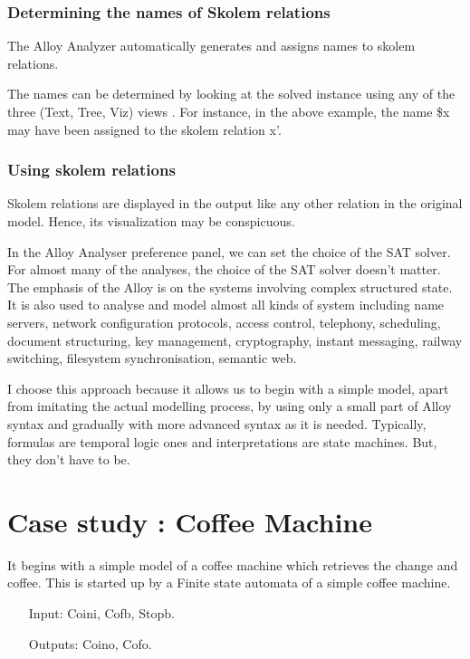 \documentclass[a4paper,12pt]{report}
\begin{document}
\begin{onehalfspacing}
\subsection{Determining the names of Skolem relations }
\label{determine skolem relations}

 The Alloy Analyzer automatically generates and assigns names to skolem relations.
 
The names can be determined by looking at the solved instance using any of the three (Text, Tree, Viz) views \cite{DanielJackson2004}.
For instance, in the above example, the name \$x may have been assigned to the skolem relation x'. 

\subsection{Using skolem relations }
\label{Use of skolem relations}

Skolem relations are displayed in the output like any other relation in the original model. Hence, its visualization may be conspicuous.

In the Alloy Analyser preference panel, we can set the choice of the SAT solver. For almost many of the analyses, the choice of the SAT solver doesn't matter. The emphasis of the Alloy is on the systems involving complex structured state. It is also used to analyse and model almost all kinds of system including name servers, network configuration protocols, access control, telephony, scheduling, document structuring, key management, cryptography, instant messaging, railway switching, filesystem synchronisation, semantic web. 

I choose this approach because it allows us to begin with a simple model, apart from imitating the actual modelling process, by using only a small part of Alloy syntax and gradually with more advanced syntax as it is needed. Typically, formulas are temporal logic ones and interpretations are state machines. But, they don't have to be.

\chapter{Case study : Coffee Machine}
\label{Ex: Coffee machine}

It begins with a simple model of a coffee machine which retrieves the change and coffee. This is started up by a Finite state automata of a simple coffee machine.

\begin{itemize}
\item[Input:]Coini, Cofb, Stopb.
\item[Outputs:]Coino, Cofo.
\end{itemize}
\begin{figure}[ht!]
\centering
\begin{tikzpicture}[->,>=stealth',shorten >=1pt,auto,node distance=5cm,
                    thick,main node/.style={circle,draw,font=\sffamily\small\bfseries}]
                    


\end{tikzpicture}
\end{figure}
\end{onehalfspacing}
\end{document}
